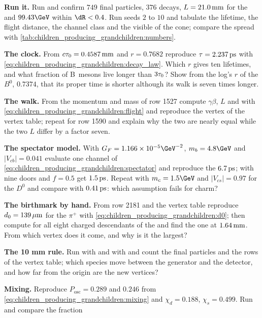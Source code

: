 \begin{exercises}
\item \textbf{Run it.} Run  and confirm
  $749$ final particles, $376$ decays, $L=21.0\,\mathrm{mm}$ for the \Bbar and
  $99.43\GeV$ within $\dR<0.4$. Run seeds $2$ to $10$ and tabulate the
  lifetime, the flight distance, the channel class and the visible \pt of
  the cone; compare the spread with
  \cref{tab:children_producing_grandchildren:numbers}.
\item \textbf{The clock.} From $c\tau_0=0.4587\,\mathrm{mm}$ and $r=0.7682$ reproduce
  $\tau=2.237\,\mathrm{ps}$ with \cref{eq:children_producing_grandchildren:decay_law}.
  Which $r$ gives ten lifetimes, and what fraction of B~mesons live
  longer than $3\tau_0$? Show from the log's $r$ of the $B^0$, $0.7374$,
  that its proper time is shorter although its walk is seven times
  longer.
\item \textbf{The walk.} From the momentum and mass of row 1527 compute
  $\gamma\beta$, $L$ and \Lxy with
  \cref{eq:children_producing_grandchildren:flight} and reproduce the
  vertex of the vertex table; repeat for row 1590 and explain why the two
  \Lxy are nearly equal while the two $L$ differ by a factor seven.
\item \textbf{The spectator model.} With $G_F=1.166\times10^{-5}\GeV^{-2}$,
  $m_b=4.8\GeV$ and $|V_{cb}|=0.041$ evaluate one channel of
  \cref{eq:children_producing_grandchildren:spectator} and reproduce the
  $6.7\,\mathrm{ps}$; with nine doors and $f=0.5$ get $1.5\,\mathrm{ps}$. Repeat with
  $m_c=1.5\GeV$ and $|V_{cs}|=0.97$ for the $D^0$ and compare with
  $0.41\,\mathrm{ps}$: which assumption fails for charm?
\item \textbf{The birthmark by hand.} From row 2181 and the vertex table
  reproduce $d_0=139\,\mu\mathrm{m}$ for the $\pi^+$ with
  \cref{eq:children_producing_grandchildren:d0}; then compute \dzero for
  all eight charged descendants of the \Bbar and find the one at
  $1.64\,\mathrm{mm}$. From which vertex does it come, and why is it the largest?
\item \textbf{The 10 mm rule.} Run with  and with
   and count the final particles and the rows of the
  vertex table; which species move between the generator and the
  detector, and how far from the origin are the new vertices?
\item \textbf{Mixing.} Reproduce $P_{\mathrm{osc}}=0.289$ and $0.246$
  from \cref{eq:children_producing_grandchildren:mixing} and $\chi_d=0.188$,
  $\chi_s=0.499$. Run  and compare the fraction

\end{exercises}

